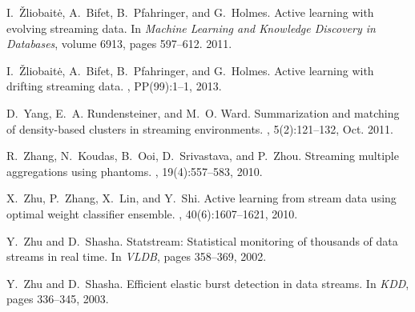 \documentclass[twoside,leqno,twocolumn]{article}
\begin{document}
\begin{thebibliography}{10}
I.~\v{Z}liobait\.{e}, A.~Bifet, B.~Pfahringer, and G.~Holmes.
\newblock Active learning with evolving streaming data.
\newblock In {\em Machine Learning and Knowledge Discovery in Databases},
  volume 6913, pages 597--612. 2011.

I.~\v{Z}liobait\.{e}, A.~Bifet, B.~Pfahringer, and G.~Holmes.
\newblock Active learning with drifting streaming data.
,
  PP(99):1--1, 2013.

D.~Yang, E.~A. Rundensteiner, and M.~O. Ward.
\newblock Summarization and matching of density-based clusters in streaming
  environments.
, 5(2):121--132, Oct. 2011.

R.~Zhang, N.~Koudas, B.~Ooi, D.~Srivastava, and P.~Zhou.
\newblock Streaming multiple aggregations using phantoms.
, 19(4):557--583, 2010.

X.~Zhu, P.~Zhang, X.~Lin, and Y.~Shi.
\newblock Active learning from stream data using optimal weight classifier
  ensemble.
, 40(6):1607--1621, 2010.

Y.~Zhu and D.~Shasha.
\newblock Statstream: Statistical monitoring of thousands of data streams in
  real time.
\newblock In {\em VLDB}, pages 358--369, 2002.

Y.~Zhu and D.~Shasha.
\newblock Efficient elastic burst detection in data streams.
\newblock In {\em KDD}, pages 336--345, 2003.

\end{thebibliography}
\end{document}
